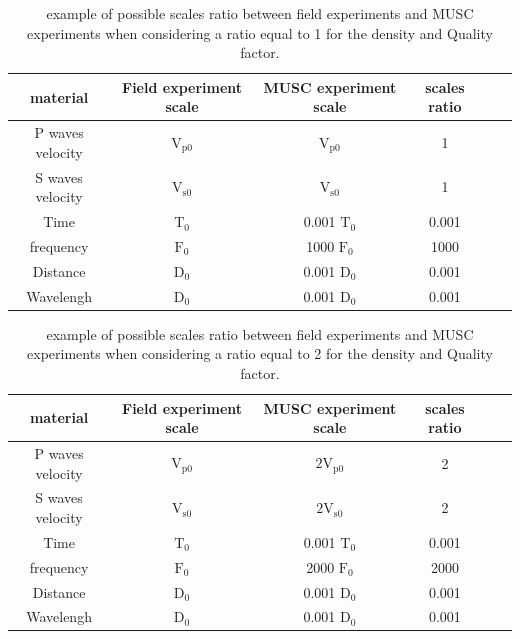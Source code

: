 \documentclass[manuscript,revised]{geophysics}
\begin{document}
\begin{table}[!ht]
	\centering
	\begin{tabular}{cccccc}
		\hline
		material & Field experiment scale & MUSC experiment scale & scales ratio  \\
		\hline
		P waves velocity & $\mathrm{V_{p 0}}$ & $\mathrm{V_{p 0}}$  & 1  \\
		S waves velocity & $\mathrm{V_{s 0}}$ &  $\mathrm{V_{s 0}}$ & 1   \\
		Time & $\mathrm{T_{0}}$    & 0.001 $\mathrm{T_{0}}$ & 0.001  \\
		frequency   & $\mathrm{F_{0}}$  & 1000 $\mathrm{F_{0}}$ & 1000  \\
		Distance   & $\mathrm{D_{0}}$  & 0.001 $\mathrm{D_{0}}$ & 0.001   \\
		Wavelengh   & $\mathrm{D_{0}}$ & 0.001 $\mathrm{D_{0}}$ & 0.001  \\
		\hline
	\end{tabular}
	\caption{ example of possible scales ratio between field experiments and MUSC experiments when considering a ratio equal to 1 for the density and Quality factor.}
	\label{epoxy-resin}
\end{table}

\begin{table}[!ht]
	\centering
	\begin{tabular}{cccccc}
		\hline
		material & Field experiment scale & MUSC experiment scale & scales ratio  \\
		\hline
		P waves velocity & $\mathrm{V_{p 0}}$ & $\mathrm{2V_{p 0}}$  & 2  \\
		S waves velocity & $\mathrm{V_{s 0}}$ &  $\mathrm{2V_{s 0}}$ & 2   \\
		Time & $\mathrm{T_{0}}$    & 0.001 $\mathrm{T_{0}}$ & 0.001  \\
		frequency   & $\mathrm{F_{0}}$  & 2000 $\mathrm{F_{0}}$ & 2000  \\
		Distance   & $\mathrm{D_{0}}$  & 0.001 $\mathrm{D_{0}}$ & 0.001   \\
		Wavelengh   & $\mathrm{D_{0}}$ & 0.001 $\mathrm{D_{0}}$ & 0.001  \\
		\hline
	\end{tabular}
	\caption{ example of possible scales ratio between field experiments and MUSC experiments when considering a ratio equal to 2 for the density and Quality factor.}
	\label{epoxy-resin}
\end{table}
\end{document}
